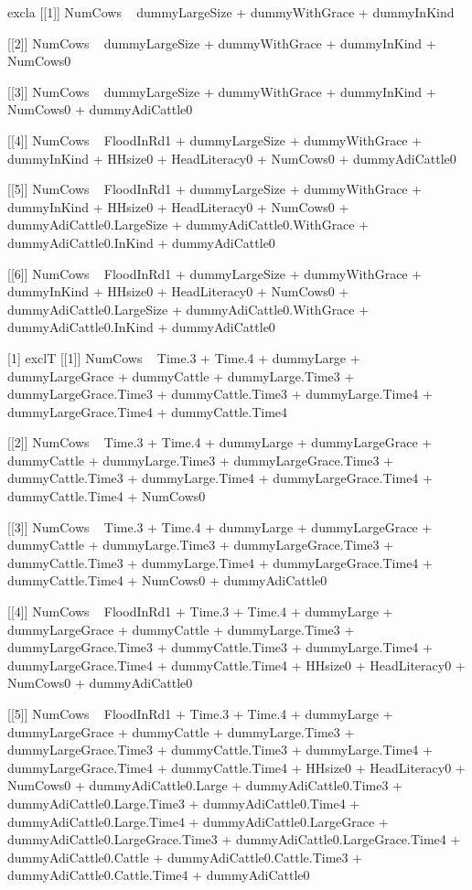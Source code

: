 \begin{Schunk}
\begin{Soutput}
[1] excla
[[1]]
NumCows ~ dummyLargeSize + dummyWithGrace + dummyInKind

[[2]]
NumCows ~ dummyLargeSize + dummyWithGrace + dummyInKind + NumCows0

[[3]]
NumCows ~ dummyLargeSize + dummyWithGrace + dummyInKind + NumCows0 + 
    dummyAdiCattle0

[[4]]
NumCows ~ FloodInRd1 + dummyLargeSize + dummyWithGrace + dummyInKind + 
    HHsize0 + HeadLiteracy0 + NumCows0 + dummyAdiCattle0

[[5]]
NumCows ~ FloodInRd1 + dummyLargeSize + dummyWithGrace + dummyInKind + 
    HHsize0 + HeadLiteracy0 + NumCows0 + dummyAdiCattle0.LargeSize + 
    dummyAdiCattle0.WithGrace + dummyAdiCattle0.InKind + dummyAdiCattle0

[[6]]
NumCows ~ FloodInRd1 + dummyLargeSize + dummyWithGrace + dummyInKind + 
    HHsize0 + HeadLiteracy0 + NumCows0 + dummyAdiCattle0.LargeSize + 
    dummyAdiCattle0.WithGrace + dummyAdiCattle0.InKind + dummyAdiCattle0

[1] exclT
[[1]]
NumCows ~ Time.3 + Time.4 + dummyLarge + dummyLargeGrace + dummyCattle + 
    dummyLarge.Time3 + dummyLargeGrace.Time3 + dummyCattle.Time3 + 
    dummyLarge.Time4 + dummyLargeGrace.Time4 + dummyCattle.Time4

[[2]]
NumCows ~ Time.3 + Time.4 + dummyLarge + dummyLargeGrace + dummyCattle + 
    dummyLarge.Time3 + dummyLargeGrace.Time3 + dummyCattle.Time3 + 
    dummyLarge.Time4 + dummyLargeGrace.Time4 + dummyCattle.Time4 + 
    NumCows0

[[3]]
NumCows ~ Time.3 + Time.4 + dummyLarge + dummyLargeGrace + dummyCattle + 
    dummyLarge.Time3 + dummyLargeGrace.Time3 + dummyCattle.Time3 + 
    dummyLarge.Time4 + dummyLargeGrace.Time4 + dummyCattle.Time4 + 
    NumCows0 + dummyAdiCattle0

[[4]]
NumCows ~ FloodInRd1 + Time.3 + Time.4 + dummyLarge + dummyLargeGrace + 
    dummyCattle + dummyLarge.Time3 + dummyLargeGrace.Time3 + 
    dummyCattle.Time3 + dummyLarge.Time4 + dummyLargeGrace.Time4 + 
    dummyCattle.Time4 + HHsize0 + HeadLiteracy0 + NumCows0 + 
    dummyAdiCattle0

[[5]]
NumCows ~ FloodInRd1 + Time.3 + Time.4 + dummyLarge + dummyLargeGrace + 
    dummyCattle + dummyLarge.Time3 + dummyLargeGrace.Time3 + 
    dummyCattle.Time3 + dummyLarge.Time4 + dummyLargeGrace.Time4 + 
    dummyCattle.Time4 + HHsize0 + HeadLiteracy0 + NumCows0 + 
    dummyAdiCattle0.Large + dummyAdiCattle0.Time3 + dummyAdiCattle0.Large.Time3 + 
    dummyAdiCattle0.Time4 + dummyAdiCattle0.Large.Time4 + dummyAdiCattle0.LargeGrace + 
    dummyAdiCattle0.LargeGrace.Time3 + dummyAdiCattle0.LargeGrace.Time4 + 
    dummyAdiCattle0.Cattle + dummyAdiCattle0.Cattle.Time3 + dummyAdiCattle0.Cattle.Time4 + 
    dummyAdiCattle0


\end{Soutput}
\end{Schunk}
